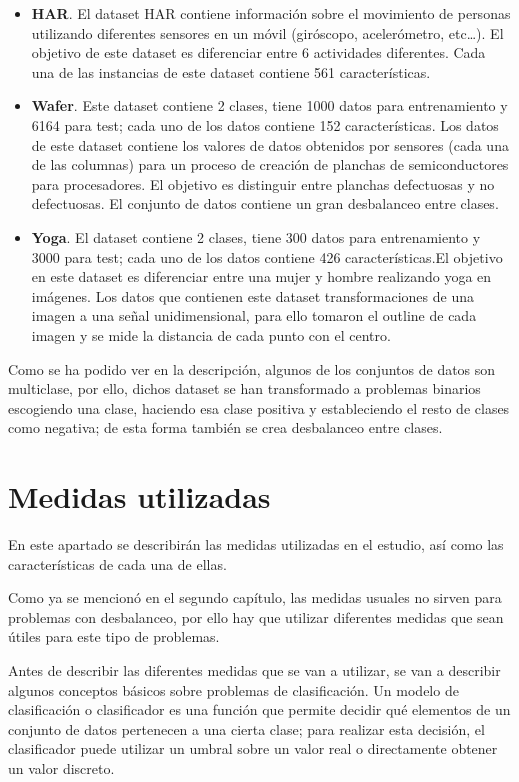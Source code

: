 \begin{itemize}
	\item \textbf{HAR}. El dataset HAR contiene información sobre el movimiento de personas utilizando diferentes sensores en un móvil (giróscopo, acelerómetro, etc…). El objetivo de este dataset es diferenciar entre 6 actividades diferentes. Cada una de las instancias de este dataset contiene 561 características.
	\item \textbf{Wafer}. Este dataset contiene 2 clases, tiene 1000 datos para entrenamiento y 6164 para test; cada uno de los datos contiene 152 características. Los datos de este dataset contiene los valores de datos obtenidos por sensores (cada una de las columnas) para un proceso de creación de planchas de semiconductores para procesadores. El objetivo es distinguir entre planchas defectuosas y no defectuosas. El conjunto de datos contiene un gran desbalanceo entre clases.
	\item \textbf{Yoga}. El dataset contiene 2 clases, tiene 300 datos para entrenamiento y 3000 para test; cada uno de los datos contiene 426 características.El objetivo en este dataset es diferenciar entre una mujer y hombre realizando yoga en imágenes. Los datos que contienen este dataset transformaciones de una imagen a una señal unidimensional, para ello tomaron el outline de cada imagen y se mide la distancia de cada punto con el centro.
\end{itemize}
\verticalspace

Como se ha podido ver en la descripción, algunos de los conjuntos de datos son multiclase, por ello, dichos dataset se han transformado a problemas binarios escogiendo una clase, haciendo esa clase positiva y estableciendo el resto de clases como negativa; de esta forma también se crea desbalanceo entre clases.\newline

\section{Medidas utilizadas}
En este apartado se describirán las medidas utilizadas en el estudio, así como las características de cada una de ellas.\newline

Como ya se mencionó en el segundo capítulo, las medidas usuales no sirven para problemas con desbalanceo, por ello hay que utilizar diferentes medidas que sean útiles para este tipo de problemas.\newline

Antes de describir las diferentes medidas que se van a utilizar, se van a describir algunos conceptos básicos sobre problemas de clasificación. Un modelo de clasificación o clasificador es una función que permite decidir qué elementos de un conjunto de datos pertenecen a una cierta clase; para realizar esta decisión, el clasificador puede utilizar un umbral sobre un valor real o directamente obtener un valor discreto.\newline

